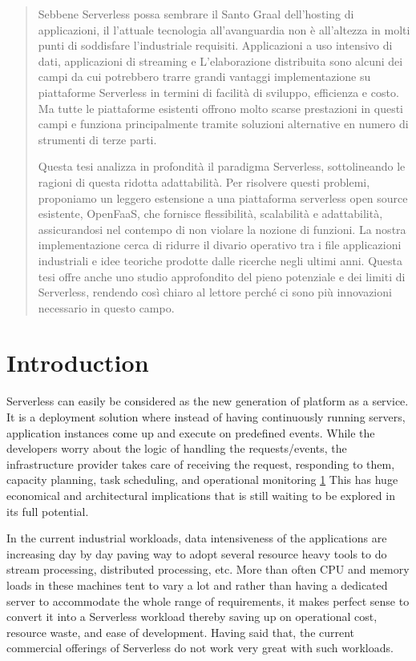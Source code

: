 \documentclass[12pt,titlepage]{article}
\begin{document}
\begin{abstract}
Sebbene Serverless possa sembrare il Santo Graal dell'hosting di applicazioni, il
l'attuale tecnologia all'avanguardia non è all'altezza in molti punti di soddisfare l'industriale
requisiti. Applicazioni a uso intensivo di dati, applicazioni di streaming e
L'elaborazione distribuita sono alcuni dei campi da cui potrebbero trarre grandi vantaggi
implementazione su piattaforme Serverless in termini di facilità di sviluppo,
efficienza e costo. Ma tutte le piattaforme esistenti offrono molto
scarse prestazioni in questi campi e funziona principalmente tramite soluzioni alternative en numero
di strumenti di terze parti.

Questa tesi analizza in profondità il paradigma Serverless,
sottolineando le ragioni di questa ridotta adattabilità. Per risolvere questi problemi, proponiamo un leggero
estensione a una piattaforma serverless open source esistente, OpenFaaS, che fornisce
flessibilità, scalabilità e adattabilità, assicurandosi nel contempo di non violare la nozione
di funzioni. La nostra implementazione cerca di ridurre il divario operativo tra i file
applicazioni industriali e idee teoriche prodotte dalle ricerche negli ultimi anni.
Questa tesi offre anche uno studio approfondito del pieno potenziale e dei limiti di
Serverless, rendendo così chiaro al lettore perché ci sono più innovazioni
necessario in questo campo.

\end{abstract}



\setcounter{tocdepth}{5}
\tableofcontents

\listoffigures

\section{Introduction}
\label{sec:orgaead383}

Serverless can easily be considered as the new generation of platform as a  
service. It is a deployment solution where instead of having continuously
running servers, application instances come up and execute on predefined events.
While the developers worry about
the logic of handling the requests/events, the infrastructure provider takes
care of receiving the request, responding to them, capacity planning, task
scheduling, and operational monitoring \hyperref[ref:1]{1}
This has huge economical and architectural implications that is
still waiting to be explored in its full potential. 

In the current industrial workloads, data intensiveness of the applications are increasing
day by day paving way to adopt several resource heavy tools to do stream
processing, distributed processing, etc. More than often CPU and memory loads in
these machines tent to vary a lot and rather than having a dedicated server to accommodate the whole range
of requirements, it makes perfect sense to convert it into a Serverless workload
thereby saving up on operational cost, resource waste, and ease of development.
Having said that, the current commercial offerings of Serverless do not work
very great with such workloads.
\end{document}
